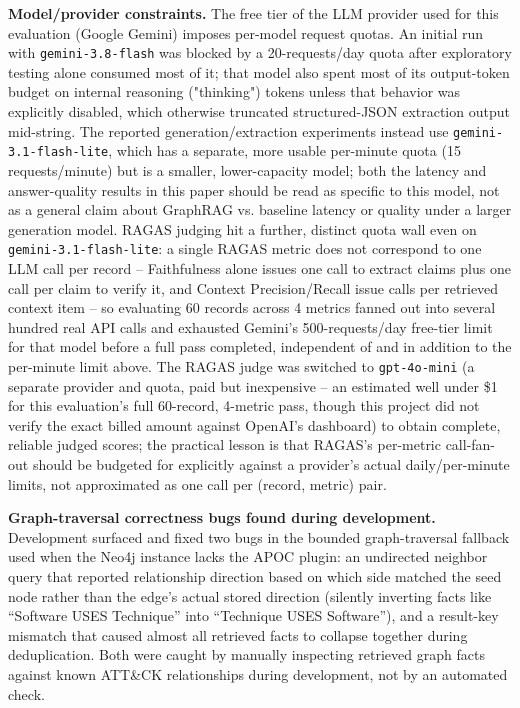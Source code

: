 \documentclass[conference]{IEEEtran}
\begin{document}
\textbf{Model/provider constraints.} The free tier of the LLM provider used
for this evaluation (Google Gemini) imposes per-model request quotas. An
initial run with \texttt{gemini-3.8-flash} was blocked by a 20-requests/day
quota after exploratory testing alone consumed most of it; that model also
spent most of its output-token budget on internal reasoning ("thinking")
tokens unless that behavior was explicitly disabled, which otherwise
truncated structured-JSON extraction output mid-string. The reported generation/extraction
experiments instead use \texttt{gemini-3.1-flash-lite}, which has a
separate, more usable per-minute quota (15 requests/minute) but is a
smaller, lower-capacity model; both the latency and answer-quality results
in this paper should be read as specific to this model, not as a general
claim about GraphRAG vs. baseline latency or quality under a larger
generation model. RAGAS judging hit a further, distinct quota wall even on
\texttt{gemini-3.1-flash-lite}: a single RAGAS metric does not correspond
to one LLM call per record -- Faithfulness alone issues one call to extract
claims plus one call per claim to verify it, and Context Precision/Recall
issue calls per retrieved context item -- so evaluating 60 records across 4
metrics fanned out into several hundred real API calls and exhausted
Gemini's 500-requests/day free-tier limit for that model before a full pass
completed, independent of and in addition to the per-minute limit above.
The RAGAS judge was switched to \texttt{gpt-4o-mini} (a separate provider
and quota, paid but inexpensive -- an estimated well under \$1 for this
evaluation's full 60-record, 4-metric pass, though this project did not
verify the exact billed amount against OpenAI's dashboard) to obtain
complete, reliable judged scores;
the practical lesson is that RAGAS's per-metric call-fan-out should be
budgeted for explicitly against a provider's actual daily/per-minute
limits, not approximated as one call per (record, metric) pair.

\textbf{Graph-traversal correctness bugs found during development.}
Development surfaced and fixed two bugs in the bounded graph-traversal
fallback used when the Neo4j instance lacks the APOC plugin: an undirected
neighbor query that reported relationship direction based on which side
matched the seed node rather than the edge's actual stored direction
(silently inverting facts like ``Software USES Technique'' into ``Technique
USES Software''), and a result-key mismatch that caused almost all retrieved
facts to collapse together during deduplication. Both were caught by
manually inspecting retrieved graph facts against known ATT\&CK relationships
during development, not by an automated check.
\end{document}
